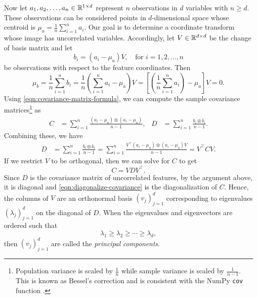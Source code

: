 Now let \(a_1, a_2, \dots, a_n \in \mathbb{R}^{1 \times d}\) represent \(n\) observations in \(d\) variables with \(n \geq d\).
These observations can be considered points in \(d\)-dimensional space whose centroid is \(\mu_a = \frac{1}{n} \sum_{i=1}^{n} a_i\).
Our goal is to determine a coordinate transform whose image has uncorrelated variables.
Accordingly, let \(V \in \mathbb{R}^{d \times d}\) be the change of basis matrix and let
\begin{equation}
    \label{eqn:transformed-points}
    b_i = (a_i - \mu_a) V, \quad \text{for \(i = 1,2,\dots,n\)}
\end{equation}
be observations with respect to the feature coordinates.
Then
\begin{equation}
    \mu_b
    = \frac{1}{n} \sum_{i=1}^{n} b_i
    = \frac{1}{n} \left( \sum_{i=1}^{n} a_i - \mu_a \right) V
    = \left[ \left( \frac{1}{n} \sum_{i=1}^{n} a_i \right) - \mu_a \right] V
    = 0.
\end{equation}
Using \cref{eqn:covariance-matrix-formula}, we can compute the sample covariance matrices\footnote{
    Population variance is scaled by \(\frac{1}{n}\) while sample variance is scaled by \(\frac{1}{n-1}\).
    This is known as Bessel's correction and is consistent with the NumPy \texttt{cov} function \cite{harris2020array}.
} as 
\begin{align}
    \label{eqn:covariance-matrix-pca}
    C &= \sum_{i=1}^{n} \frac{(a_i - \mu_a) \otimes (a_i - \mu_a)}{n-1}, &
    D &= \sum_{i=1}^{n} \frac{b_i \otimes b_i}{n-1}.
\end{align}
Combining these, we have
\begin{align}
    D &= \sum_{i=1}^{n} \frac{b_i \otimes b_i}{n-1}
    = \sum_{i=1}^{n} \frac{V^\top (a_i - \mu_a) \otimes (a_i - \mu_a) V}{n-1}
    = V^\top C V.
\end{align}
If we restrict \(V\) to be orthogonal, then we can solve for \(C\) to get
\begin{equation}
    \label{eqn:diagonalize-covariance}
    C = V D V^\top.
\end{equation}
Since \(D\) is the covariance matrix of uncorrelated features, by the argument above, it is diagonal and \cref{eqn:diagonalize-covariance} is the diagonalization of \(C\).
Hence, the columns of \(V\) are an orthonormal basis \((v_j)_{j=1}^d\) corresponding to eigenvalues \((\lambda_j)_{j=1}^d\) on the diagonal of \(D\).
When the eigenvalues and eigenvectors are ordered such that
\begin{equation}
    \label{eqn:eigenvalue-order}
    \lambda_1 \geq \lambda_2 \geq \cdots \geq \lambda_d,
\end{equation}
then \((v_j)_{j=1}^d\) are called the \textit{principal components}.

